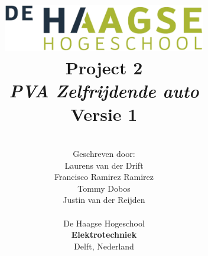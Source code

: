 \title{
\includegraphics[width=3.5in]{IMG/HHS.png} \\
\vspace*{2in}
\textbf{Project 2}\\
\textit{PVA Zelfrijdende auto}\\
Versie 1
}
\author{
\vspace*{2.5in} \\
  Geschreven door:\\
  Laurens van der Drift\\
  Francisco Ramirez Ramirez\\
  Tommy Dobos\\
  Justin van der Reijden\\
		\vspace*{0.5in} \\
		De Haagse Hogeschool\\
        \textbf{Elektrotechniek}\\
        Delft, Nederland
       } 